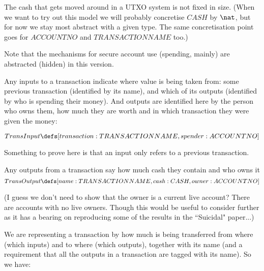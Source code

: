 \documentclass[11pt]{amsart}
\begin{document}
The cash that gets moved around in a UTXO system is not fixed in size. (When we want to try out this model we will probably concretise $CASH$ by $\nat$, but for now we stay most abstract with a given type. The same concretisation point goes for $ACCOUNTNO$ and $TRANSACTIONNAME$ too.)


Note that the mechanisms for secure account use (spending, mainly) are abstracted (hidden) in this version. 


Any inputs to a transaction indicate where value is being taken from: some previous
 transaction (identified by its name), and which of its outputs (identified by who is spending their money). And outputs are identified here by the person who owns them, how much they are worth and in which transaction they were given the money:
 

 \[
  TransInput \defs [transaction : TRANSACTIONNAME, spender : ACCOUNTNO]
\]


Something to prove here is that an input only refers to a previous transaction.

Any outputs from a transaction say how much cash they contain and who owns it
\[
  TransOutput \defs [name : TRANSACTIONNAME, cash : CASH, owner : ACCOUNTNO]
 \]
 
(I guess we don't need to show that the owner is a current live account? There are accounts with no live owners. Though this would be useful to consider further as it has a bearing on reproducing some of the results in the ``Suicidal" paper...)
                       
 We are representing a transaction by how much is being transferred from where (which inputs)
 and to where (which outputs), together with its name (and a requirement that all the outputs in a transaction are tagged with its name). So we have:
 
\end{document}
